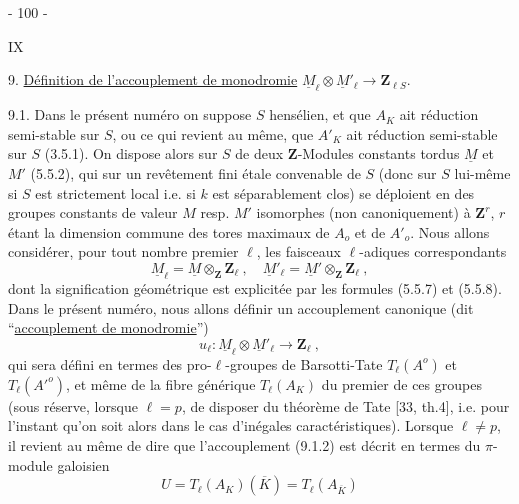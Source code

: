 \begin{center}- 100 -\end{center}\hfill IX

9. \uline{Définition de l'accouplement de monodromie} $\underline M_\ell\otimes\underline M'_\ell\longrightarrow\mathbf Z_{\ell S}$.

9.1. Dans le présent numéro on suppose $S$ hensélien, et que $A_K$ ait réduction semi-stable sur $S$, ou ce qui revient au même, que $A'_K$ ait réduction semi-stable sur $S$ (3.5.1). On dispose alors sur $S$ de deux $\mathbf Z$-Modules constants tordus $\underline M$ et $M'$ (5.5.2), qui sur un revêtement fini étale convenable de $S$ (donc sur $S$ lui-même si $S$ est strictement local i.e. si $k$ est séparablement clos) se déploient en des groupes constants de valeur $M$ resp. $M'$ isomorphes (non canoniquement) à $\mathbf Z^r$, $r$ étant la dimension commune des tores maximaux de $A_o$ et de $A'_o$. Nous allons considérer, pour tout nombre premier $\ell$, les faisceaux $\ell$-adiques correspondants
\[
\tag{9.1.1}\underline M_\ell=\underline M\otimes_{\mathbf Z}\mathbf Z_\ell\ ,\quad
\underline M'_\ell=\underline M'\otimes_{\mathbf Z}\mathbf Z_\ell\ ,
\]
dont la signification géométrique est explicitée par les formules (5.5.7) et (5.5.8). Dans le présent numéro, nous allons définir un accouplement canonique (dit ``\uline{accouplement de monodromie}'')
\[
\tag{9.1.2}u_\ell:\underline M_\ell\otimes\underline M'_\ell\longrightarrow\mathbf Z_\ell\ ,
\]
qui sera défini en termes des pro-$\ell$-groupes de Barsotti-Tate $T_\ell(A^o)$ et $T_\ell(A'^o)$, et même de la fibre générique $T_\ell(A_K)$ du premier de ces groupes (sous réserve, lorsque $\ell=p$, de disposer du théorème de Tate [33, th.4], i.e. pour l'instant qu'on soit alors dans le cas d'inégales caractéristiques). Lorsque $\ell\ne p$, il revient au même de dire que l'accouplement (9.1.2) est décrit en termes du $\pi$-module galoisien
\[
\tag{9.1.3}U=T_\ell(A_K)(\overline K)=T_\ell(A_{\overline K})
\]
